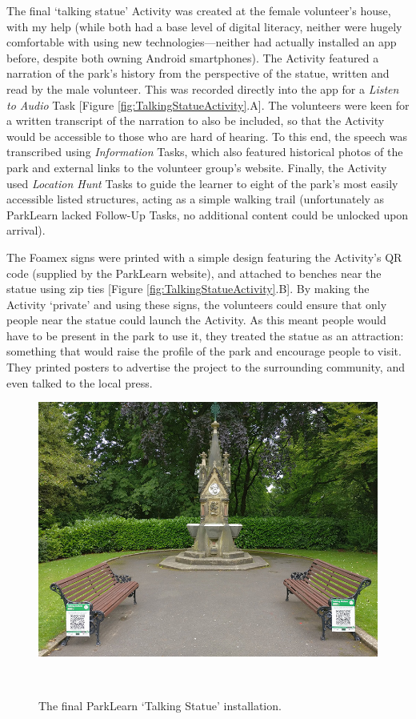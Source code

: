 The final `talking statue' Activity was created at the female volunteer's house, with my help (while both had a base level of digital literacy, neither were hugely comfortable with using new technologies---neither had actually installed an app before, despite both owning Android smartphones). The Activity featured a narration of the park's history from the perspective of the statue, written and read by the male volunteer. This was recorded directly into the app for a \textit{Listen to Audio} Task [Figure \ref{fig:TalkingStatueActivity}.A]. The volunteers were keen for a written transcript of the narration to also be included, so that the Activity would be accessible to those who are hard of hearing. To this end, the speech was transcribed using \textit{Information} Tasks, which also featured historical photos of the park and external links to the volunteer group's website. Finally, the Activity used \textit{Location Hunt} Tasks to guide the learner to eight of the park's most easily accessible listed structures, acting as a simple walking trail (unfortunately as ParkLearn lacked Follow-Up Tasks, no additional content could be unlocked upon arrival).

The Foamex signs were printed with a simple design featuring the Activity's QR code (supplied by the ParkLearn website), and attached to benches near the statue using zip ties [Figure \ref{fig:TalkingStatueActivity}.B]. By making the Activity ‘private’ and using these signs, the volunteers could ensure that only people near the statue could launch the Activity. As this meant people would have to be present in the park to use it, they treated the statue as an attraction: something that would raise the profile of the park and encourage people to visit. They printed posters to advertise the project to the surrounding community, and even talked to the local press. 

\begin{figure}
  \centering
  \includegraphics[width=0.85\columnwidth]{images/chapter06/TalkingStatue.jpg}
  \caption[The ParkLearn `Talking Statue' installation]{The final ParkLearn `Talking Statue' installation.}~\label{fig:TalkingStatue}
\end{figure}

